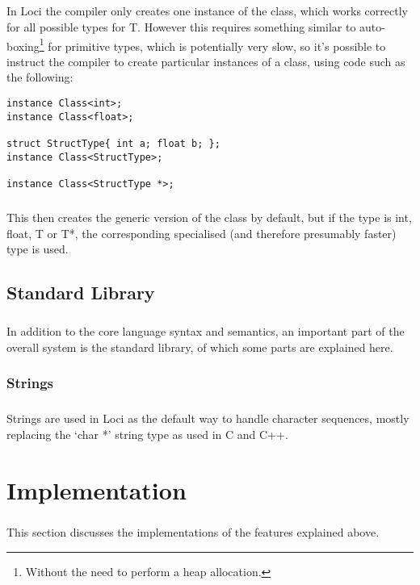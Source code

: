 \documentclass[12pt,twoside,notitlepage]{report}
\begin{document}
\paragraph{}
In Loci the compiler only creates one instance of the class, which works correctly for all possible types for T. However this requires something similar to auto-boxing\footnote{Without the need to perform a heap allocation.} for primitive types, which is potentially very slow, so it's possible to instruct the compiler to create particular instances of a class, using code such as the following:

\small{
\begin{verbatim}
instance Class<int>;
instance Class<float>;

struct StructType{ int a; float b; };
instance Class<StructType>;

instance Class<StructType *>;
\end{verbatim}
}

\paragraph{}
This then creates the generic version of the class by default, but if the type is int, float, T or T*, the corresponding specialised (and therefore presumably faster) type is used.

\section{Standard Library}

\paragraph{}
In addition to the core language syntax and semantics, an important part of the overall system is the standard library, of which some parts are explained here.

\subsection{Strings}

\paragraph{}
Strings are used in Loci as the default way to handle character sequences, mostly replacing the `char *' string type as used in C and C++.

\cleardoublepage

\chapter{Implementation}

\paragraph{}
This section discusses the implementations of the features explained above.
\end{document}
